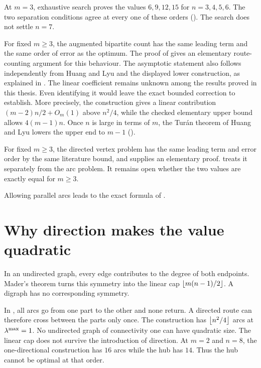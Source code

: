At $m=3$, exhaustive search proves the values $6,9,12,15$ for $n=3,4,5,6$.
The two separation conditions agree at every one of these orders ().
The search does not settle $n=7$.

For fixed $m\ge3$, the augmented bipartite count has the same leading term and the same order of error as the optimum.
The proof of  gives an elementary
route-counting argument for this behaviour. The asymptotic statement also
follows independently from Huang and Lyu \cite{HuangLyu26} and the displayed
lower construction, as explained in .
The linear coefficient remains unknown among the results proved in this thesis.
Even identifying it would leave the exact bounded correction to establish.
More precisely, the construction gives a linear contribution $(m-2)n/2+O_m(1)$ above $n^2/4$, while the checked elementary upper bound allows $4(m-1)n$.
Once $n$ is large in terms of $m$, the Tur\'an theorem of Huang and Lyu \cite{HuangLyu26} lowers the upper end to $m-1$ ().

For fixed $m\ge3$, the directed vertex problem has the same leading term and error order by the same literature bound, and  supplies an elementary proof.
 treats it separately from the arc problem.
It remains open whether the two values are exactly equal for $m \ge 3$.

Allowing parallel arcs leads to the exact formula of .

\section{Why direction makes the value quadratic}

In an undirected graph, every edge contributes to the degree of both endpoints.
Mader's theorem turns this symmetry into the linear cap $\left\lfloor m(n-1)/2 \right\rfloor$.
A digraph has no corresponding symmetry.

In , all arcs go from one part to the other and none return.
A directed route can therefore cross between the parts only once.
The construction has $\left\lfloor n^2/4 \right\rfloor$ arcs at $\lambda^{\max}=1$.
No undirected graph of connectivity one can have quadratic size.
The linear cap does not survive the introduction of direction.
At $m=2$ and $n=8$, the one-directional construction has $16$ arcs while the hub has $14$.
Thus the hub cannot be optimal at that order.

